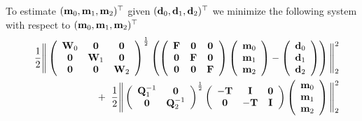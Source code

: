 \documentclass[11pt]{article}
\newcommand{\bfF}	{{\bf{F}}}
\newcommand{\bfI}	{{\bf{I}}}
\newcommand{\bfL}	{{\bf{L}}}
\newcommand{\bfQ}	{{\bf{Q}}}
\newcommand{\bfT}	{{\bf{T}}}
\newcommand{\bfW}	{{\bf{W}}}
\newcommand{\bfd}	{{\bf{d}}}
\newcommand{\bfm}	{{\bf{m}}}
\newcommand{\hf}        {{\frac 12}}
\newcommand {\zero}  { {\bf 0} }
\renewcommand{\hf}		 {\frac12}
\begin{document}
To estimate $(\bfm_0,\bfm_1,\bfm_2)^{\top}$ given $(\bfd_0,\bfd_1,\bfd_2)^{\top}$ we minimize the following system with respect to $(\bfm_0,\bfm_1,\bfm_2)^{\top}$
\begin{eqnarray}
\nonumber
&&\hf\Bigg\|
\left(\begin{array}{ccc}\bfW_0 & \zero & \zero \\ \zero & \bfW_1 & \zero \\ \zero & \zero & \bfW_2 \end{array}\right)^{\hf}	
\left(
\left(\begin{array}{ccc}\bfF & \zero & \zero \\   \zero & \bfF & \zero\\\zero & \zero& \bfF \end{array}\right)	
\left(\begin{array}{c}  \bfm_0  \\ \bfm_1 \\ \bfm_2\end{array}\right) -
\left(\begin{array}{c} \bfd_0   \\ \bfd_1 \\ \bfd_2\end{array}\right)
\right)\Bigg\|^2_2\\
 &&+ \;\;
\hf\Bigg\|
\left(\begin{array}{cc}\bfQ^{-1}_1 & \zero \\ \zero& \bfQ^{-1}_2 \end{array}\right)^{\hf}
\left( \begin{array}{ccc} -\bfT & \bfI & \zero  \\ \zero & -\bfT & \bfI \end{array}\right)
\left(\begin{array}{c}  \bfm_0  \\ \bfm_1 \\ \bfm_2 \end{array}\right)\Bigg\|^2_2
\end{eqnarray}
\end{document}
